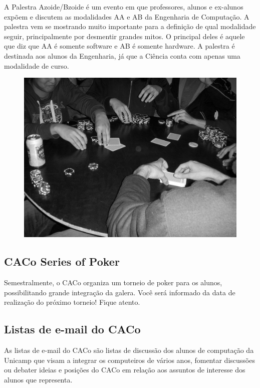A Palestra Azoide/Bzoide é um evento em que professores, alunos e ex-alunos expõem
e discutem as modalidades AA e AB da Engenharia de Computação. A palestra vem se mostrando muito importante
para a definição de qual modalidade seguir, principalmente por desmentir grandes
mitos. O principal deles é aquele que diz que AA é somente software e AB
é somente hardware. A palestra é destinada aos alunos da Engenharia,
já que a Ciência conta com apenas uma modalidade de curso.
\begin{figure}[h!]
    \vspace{0pt}
    \centering
    \includegraphics[scale=0.55, keepaspectratio=true]{img/imgs/21-CACo/poker.jpg}
    \vspace{-10pt}
\end{figure}


\subsection{CACo Series of Poker}

Semestralmente, o CACo organiza um torneio de poker para os alunos,
possibilitando grande integração da galera. Você será informado da data de
realização do próximo torneio! Fique atento.

\subsection{Listas de e-mail do CACo}

As listas de e-mail do CACo são listas de discussão dos alunos de computação da
Unicamp que visam a integrar os computeiros de vários anos, fomentar discussões
ou debater ideias e posições do CACo em relação aos assuntos de interesse dos
alunos que representa.

